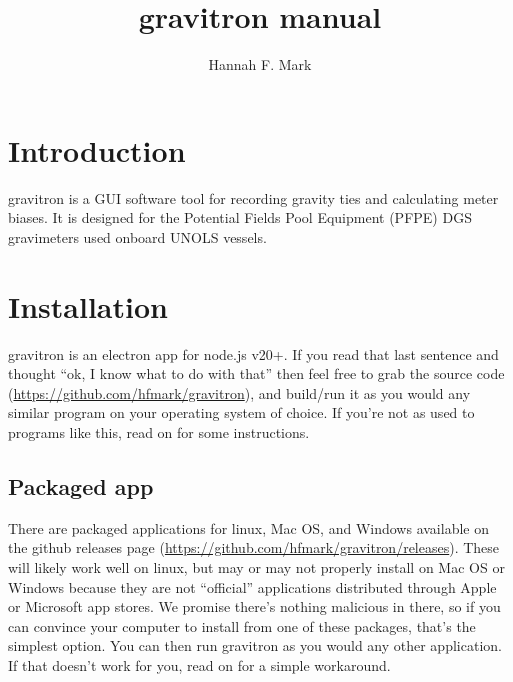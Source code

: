 \documentclass{pfpe-manual}
\title{gravitron manual}
\author{Hannah F. Mark}
\begin{document}
\maketitle

\tableofcontents
\newpage

\section{Introduction}

gravitron is a GUI software tool for recording gravity ties and calculating meter biases. It is designed for the Potential Fields Pool Equipment (PFPE) DGS gravimeters used onboard UNOLS vessels.

\section{Installation}
\label{install}
gravitron is an electron app for node.js v20+. If you read that last sentence and thought ``ok, I know what to do with that'' then feel free to grab the source code (\url{https://github.com/hfmark/gravitron}), and build/run it as you would any similar program on your operating system of choice. If you're not as used to programs like this, read on for some instructions.

\subsection{Packaged app}
There are packaged applications for linux, Mac OS, and Windows available on the github releases page (\url{https://github.com/hfmark/gravitron/releases}). These will likely work well on linux, but may or may not properly install on Mac OS or Windows because they are not ``official'' applications distributed through Apple or Microsoft app stores. We promise there's nothing malicious in there, so if you can convince your computer to install from one of these packages, that's the simplest option. You can then run gravitron as you would any other application. If that doesn't work for you, read on for a simple workaround.
\end{document}
